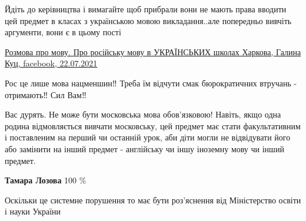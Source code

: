 \begin{itemize}
 

Йдіть до керівництва і вимагайте щоб прибрали вони не мають права вводити цей
предмет в класах з українською мовою викладання..але попередньо вивчіть
аргументи, вони є в цьому пості

\href{https://m.facebook.com/story.php?story_fbid=1544598909221453&id=100010140758684}{%
Розмова про мову.  Про російську мову в УКРАЇНСЬКИХ школах Харкова, Галина Куц, facebook, 22.07.2021%
}

 
Рос це лише мова нацменшин‼️ Треба їм відчути смак бюрократичних втручань - отримають‼️ Сил Вам‼️


 

Вас дурять. Не може бути московська мова обов'язковою! Навіть, якщо одна родина
відмовляється вивчати московську, цей предмет має стати факультативним і
поставленим на перший чи останній урок, аби діти могли не відвідувати його або
замінити на інший предмет - англійську чи іншу іноземну мову чи інший предмет.

 
\textbf{Тамара Лозова} 100 \%

 
Оскільки це системне порушення то має бути роз'яснення від Міністерство освіти і науки України


\end{itemize}
